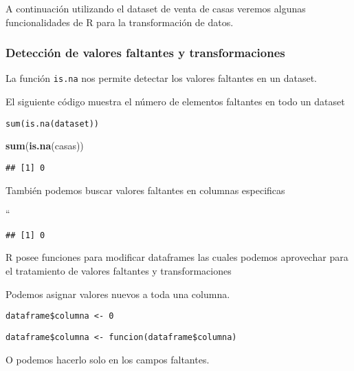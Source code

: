 \documentclass[]{article}
\newenvironment{Shaded}{\begin{snugshade}}{\end{snugshade}}
\newcommand{\KeywordTok}[1]{\textcolor[rgb]{0.13,0.29,0.53}{\textbf{#1}}}
\newcommand{\NormalTok}[1]{#1}
\newcommand{\OperatorTok}[1]{\textcolor[rgb]{0.81,0.36,0.00}{\textbf{#1}}}
\begin{document}
A continuación utilizando el dataset de venta de casas veremos algunas
funcionalidades de R para la transformación de datos.

\hypertarget{deteccion-de-valores-faltantes-y-transformaciones}{%
\subsubsection{Detección de valores faltantes y
transformaciones}\label{deteccion-de-valores-faltantes-y-transformaciones}}

La función \texttt{is.na} nos permite detectar los valores faltantes en
un dataset.

El siguiente código muestra el número de elementos faltantes en todo un
dataset

\texttt{sum(is.na(dataset))}

\begin{Shaded}
\begin{Highlighting}[]
\KeywordTok{sum}\NormalTok{(}\KeywordTok{is.na}\NormalTok{(casas))}
\end{Highlighting}
\end{Shaded}

\begin{verbatim}
## [1] 0
\end{verbatim}

También podemos buscar valores faltantes en columnas especificas

``

\begin{Shaded}
\end{Shaded}

\begin{verbatim}
## [1] 0
\end{verbatim}

R posee funciones para modificar dataframes las cuales podemos
aprovechar para el tratamiento de valores faltantes y transformaciones

Podemos asignar valores nuevos a toda una columna.

\texttt{dataframe\$columna\ \textless{}-\ 0}

\texttt{dataframe\$columna\ \textless{}-\ funcion(dataframe\$columna)}

O podemos hacerlo solo en los campos faltantes.
\end{document}
